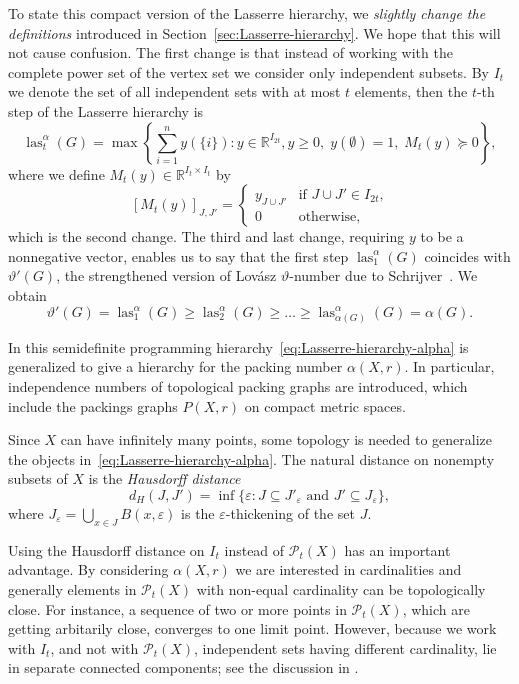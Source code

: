 \documentclass{amsart}
\newcommand{\R}{\mathbb{R}}
\DeclareMathOperator{\las}{las}
\begin{document}
To state this compact version of the Lasserre hierarchy, we
\textit{slightly change the definitions} introduced in
Section~\ref{sec:Lasserre-hierarchy}. We hope that this will not cause
confusion. The first change is that instead of working with the
complete power set of the vertex set we consider only independent
subsets. By $I_t$ we denote the set of all independent sets with at
most $t$ elements, then the $t$-th step of the Lasserre hierarchy is
\begin{equation}
  \label{eq:Lasserre-hierarchy-alpha}
\las^\alpha_t(G) = \max\left\{ \sum_{i=1}^n y(\{i\}) : y \in \R^{I_{2t}}, y\geq 0,
  \; y(\emptyset) =
      1, \; M_t(y) \succeq 0\right\},
  \end{equation}
  where we define $M_t(y) \in \R^{I_t \times I_t}$ by
  \[
    [M_t(y)]_{J,J'} = \begin{cases}
      y_{J \cup J'} & \text{if $J \cup J' \in I_{2t}$,}\\
      0 & \text{otherwise},
      \end{cases}
    \]
    which is the second change.  The third and last change, requiring
    $y$ to be a nonnegative vector, enables us to say that the first
    step $\las^\alpha_1(G)$ coincides with $\vartheta'(G)$, the
    strengthened version of Lov\'asz $\vartheta$-number
    \cite{Lovasz-1979} due to Schrijver~\cite{Schrijver-1979}. We obtain
    \[
      \vartheta'(G) = \las^\alpha_1(G) \geq \las^\alpha_2(G) \geq \ldots \geq
      \las^\alpha_{\alpha(G)}(G) = \alpha(G).
    \]

    In \cite{de-Laat-Vallentin-2015} this semidefinite programming
    hierarchy~\eqref{eq:Lasserre-hierarchy-alpha} is generalized to
    give a hierarchy for the packing number $\alpha(X,r)$. In
    particular, independence numbers of topological packing graphs are
    introduced, which include the packings graphs $P(X,r)$ on compact
    metric spaces.

    Since $X$ can have infinitely many points, some topology is needed
    to generalize the objects
    in~\eqref{eq:Lasserre-hierarchy-alpha}. The natural distance on
    nonempty subsets of $X$ is the \emph{Hausdorff distance}
\[
  d_H(J,J') = \inf\{\varepsilon : J \subseteq J'_{\varepsilon} \text{ and }
  J' \subseteq J_{\varepsilon}\},
\]
where $J_\varepsilon = \bigcup_{x \in J} B(x,\varepsilon)$ is the
$\varepsilon$-thickening of the set $J$. 

Using the Hausdorff distance on $I_t$ instead of $\mathcal{P}_t(X)$
has an important advantage. By considering $\alpha(X,r)$ we are
interested in cardinalities and generally elements in
$\mathcal{P}_t(X)$ with non-equal cardinality can be topologically
close. For instance, a sequence of two or more points in $\mathcal{P}_t(X)$, which are getting arbitarily close, converges to one limit point. However, because we work with $I_t$, and not with
$\mathcal{P}_t(X)$, independent sets having different cardinality, lie
in separate connected components; see the discussion in \cite[Section
2]{de-Laat-Vallentin-2015}.
\end{document}
